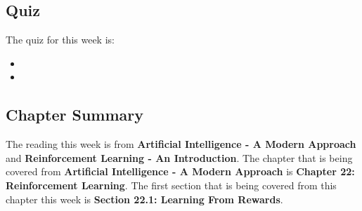 \subsection{Quiz}

The quiz for this week is:

\begin{itemize}
    \item {}
    \item {}
\end{itemize}

\newpage

\subsection{Chapter Summary}

The reading this week is from \textbf{Artificial Intelligence - A Modern Approach} and \textbf{Reinforcement Learning - An Introduction}. The chapter that is being covered from \textbf{Artificial Intelligence - A Modern Approach}
is \textbf{Chapter 22: Reinforcement Learning}. The first section that is being covered from this chapter this week is \textbf{Section 22.1: Learning From Rewards}.

